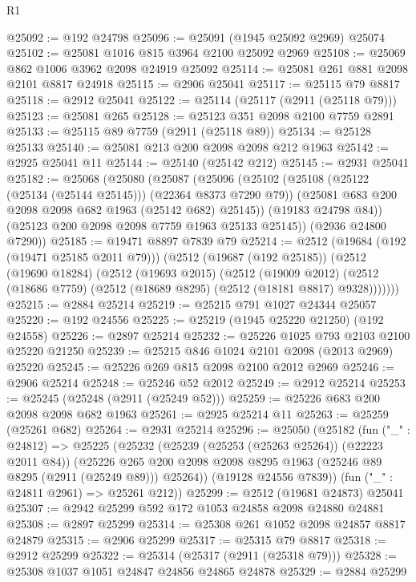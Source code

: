 \begin{lexlean}{R1}
\begin{coremodule}
@25092 := @192 @24798
@25096 := @25091 (@1945 @25092 @2969) @25074
@25102 := @25081 @1016 @815 @3964 @2100 @25092 @2969
@25108 := @25069 @862 @1006 @3962 @2098 @24919 @25092
@25114 := @25081 @261 @881 @2098 @2101 @8817 @24918
@25115 := @2906 @25041
@25117 := @25115 @79 @8817
@25118 := @2912 @25041
@25122 := @25114 (@25117 (@2911 (@25118 @79)))
@25123 := @25081 @265
@25128 := @25123 @351 @2098 @2100 @7759 @2891
@25133 := @25115 @89 @7759 (@2911 (@25118 @89))
@25134 := @25128 @25133
@25140 := @25081 @213 @200 @2098 @2098 @212 @1963
@25142 := @2925 @25041 @11
@25144 := @25140 (@25142 @212)
@25145 := @2931 @25041
@25182 := @25068
    (@25080
      (@25087
        (@25096
          (@25102
            (@25108 (@25122 (@25134 (@25144 @25145))) (@22364 @8373 @7290 @79))
            (@25081 @683 @200 @2098 @2098 @682 @1963 (@25142 @682) @25145))
          (@19183 @24798 @84))
        (@25123 @200 @2098 @2098 @7759 @1963 @25133 @25145))
      (@2936 @24800 @7290))
@25185 := @19471 @8897 @7839 @79
@25214 := @2512
    (@19684 (@192 (@19471 @25185 @2011 @79)))
    (@2512
      (@19687 (@192 @25185))
      (@2512
        (@19690 @18284)
        (@2512
          (@19693 @2015)
          (@2512
            (@19009 @2012)
            (@2512 (@18686 @7759) (@2512 (@18689 @8295) (@2512 (@18181 @8817) @9328)))))))
@25215 := @2884 @25214
@25219 := @25215 @791 @1027 @24344 @25057
@25220 := @192 @24556
@25225 := @25219 (@1945 @25220 @21250) (@192 @24558)
@25226 := @2897 @25214
@25232 := @25226 @1025 @793 @2103 @2100 @25220 @21250
@25239 := @25215 @846 @1024 @2101 @2098 (@2013 @2969) @25220
@25245 := @25226 @269 @815 @2098 @2100 @2012 @2969
@25246 := @2906 @25214
@25248 := @25246 @52 @2012
@25249 := @2912 @25214
@25253 := @25245 (@25248 (@2911 (@25249 @52)))
@25259 := @25226 @683 @200 @2098 @2098 @682 @1963
@25261 := @2925 @25214 @11
@25263 := @25259 (@25261 @682)
@25264 := @2931 @25214
@25296 := @25050
    (@25182
      (fun ("_" : @24812) =>
      @25225
        (@25232
          (@25239 (@25253 (@25263 @25264)) (@22223 @2011 @84))
          (@25226 @265 @200 @2098 @2098 @8295 @1963 (@25246 @89 @8295 (@2911 (@25249 @89))) @25264))
        (@19128 @24556 @7839))
      (fun ("_" : @24811 @2961) => @25261 @212))
@25299 := @2512 (@19681 @24873) @25041
@25307 := @2942 @25299 @592 @172 @1053 @24858 @2098 @24880 @24881
@25308 := @2897 @25299
@25314 := @25308 @261 @1052 @2098 @24857 @8817 @24879
@25315 := @2906 @25299
@25317 := @25315 @79 @8817
@25318 := @2912 @25299
@25322 := @25314 (@25317 (@2911 (@25318 @79)))
@25328 := @25308 @1037 @1051 @24847 @24856 @24865 @24878
@25329 := @2884 @25299

\end{coremodule}
\end{lexlean}
